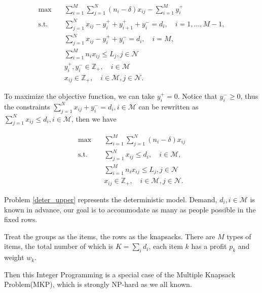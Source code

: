 \begin{equation}\label{one_form}
  \begin{aligned}
  \max \quad & \sum_{i=1}^{M}  \sum_{j= 1}^{N} (n_i-\delta) x_{ij} - \sum_{i=1}^{M} y_{i}^{+}  \\
  \text {s.t.} \quad & \sum_{j= 1}^{N} x_{ij} - y_{i}^{+}+ y_{i+1}^{+} + y_{i}^{-} = d_{i}, \quad i = 1, \ldots, M-1, \\
  & \sum_{j= 1}^{N} x_{ij} -y_{i}^{+} + y_{i}^{-} = d_{i}, \quad i = M, \\
  & \sum_{i=1}^{M} n_{i} x_{ij} \leq L_j, j \in \mathcal{N}\\
  & y_{i}^{+}, y_{i}^{-} \in \mathbb{Z}_{+}, \quad i \in \mathcal{M} \\
  & x_{ij} \in \mathbb{Z}_{+}, \quad i \in \mathcal{M}, j \in \mathcal{N}.
  \end{aligned}
\end{equation}

To maximize the objective function, we can take $y_i^{+} = 0$. Notice that $y_{i}^{-} \geq 0$, thus the constraints $\sum_{j= 1}^{N} x_{ij} + y_{i}^{-} = d_{i}, i \in \mathcal{M}$ can be rewritten as $\sum_{j= 1}^{N} x_{ij} \leq d_{i}, i \in \mathcal{M}$, then we have

\begin{equation}\label{deter_upper}
  \begin{aligned}
  \max \quad & \sum_{i=1}^{M}  \sum_{j= 1}^{N} (n_i- \delta) x_{ij} \\
  \text {s.t.} \quad & \sum_{j= 1}^{N} x_{ij} \leq d_{i}, \quad i \in \mathcal{M}, \\
  & \sum_{i=1}^{M} n_{i} x_{ij} \leq L_j, j \in \mathcal{N} \\
  & x_{ij} \in \mathbb{Z}_{+}, \quad i \in \mathcal{M}, j \in \mathcal{N}.
  \end{aligned}
\end{equation}

Problem \eqref{deter_upper} represents the deterministic model. Demand, $d_i, i \in \mathcal{M}$ is known in advance, our goal is to accommodate as many as people possible in the fixed rows.

Treat the groups as the items, the rows as the knapsacks. There are $M$ types of items, the total number of which is $K = \sum_{i} d_i$, each item $k$ has a profit $p_k$ and weight $w_k$. 

Then this Integer Programming is a special case of the Multiple Knapsack Problem(MKP), which is strongly NP-hard as we all known.

